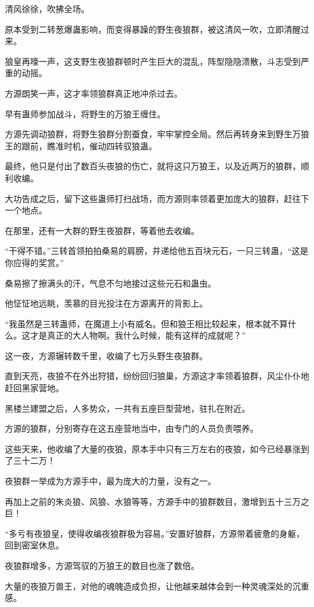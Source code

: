 \begin{this_body}
清风徐徐，吹拂全场。

原本受到二转葱爆蛊影响，而变得暴躁的野生夜狼群，被这清风一吹，立即清醒过来。

狼皇再嚎一声，这支野生夜狼群顿时产生巨大的混乱，阵型隐隐溃散，斗志受到严重的动摇。

方源朗笑一声，这才率领狼群真正地冲杀过去。

早有蛊师参加战斗，将野生的万狼王缠住。

方源先调动狼群，将野生狼群分割蚕食，牢牢掌控全局。然后再转身来到野生万狼王的跟前，瞧准时机，催动四转驭狼蛊。

最终，他只是付出了数百头夜狼的伤亡，就将这只万狼王，以及近两万的狼群，顺利收编。

大功告成之后，留下这些蛊师打扫战场，而方源则率领着更加庞大的狼群，赶往下一个地点。

在那里，还有一大群的野生夜狼群，等着他去收编。

“干得不错。”三转首领拍拍桑易的肩膀，并递给他五百块元石，一只三转蛊，“这是你应得的奖赏。”

桑易擦了擦满头的汗，气息不匀地接过这些元石和蛊虫。

他怔怔地远眺，羡慕的目光投注在方源离开的背影上。

“我虽然是三转蛊师，在魔道上小有威名。但和狼王相比较起来，根本就不算什么。这才是真正的大人物啊。我什么时候，能有这样的成就呢？”

这一夜，方源辗转数千里，收编了七万头野生夜狼群。

直到天亮，夜狼不在外出狩猎，纷纷回归狼巢，方源这才率领着狼群，风尘仆仆地赶回黑家营地。

黑楼兰建盟之后，人多势众，一共有五座巨型营地，驻扎在附近。

方源的狼群，分别寄存在这五座营地当中，由专门的人员负责喂养。

这些天来，他收编了大量的夜狼，原本手中只有三万左右的夜狼，如今已经暴涨到了三十二万！

夜狼群一举成为方源手中，最为庞大的力量，没有之一。

再加上之前的朱炎狼、风狼、水狼等等，方源手中的狼群数目，激增到五十三万之巨！

“多亏有夜狼皇，使得收编夜狼群极为容易。”安置好狼群，方源带着疲惫的身躯，回到密室休息。

夜狼群增多，方源驾驭的万狼王的数目也涨了数倍。

大量的夜狼万兽王，对他的魂魄造成负担，让他越来越体会到一种灵魂深处的沉重感。


\end{this_body}
